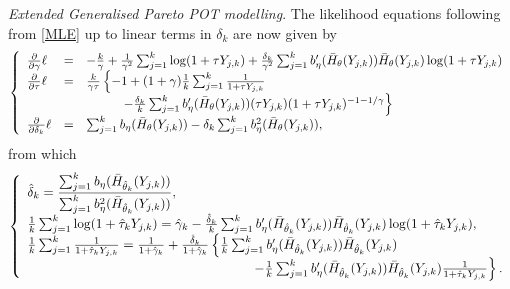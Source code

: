 \vspace{0.2cm}\noindent
{\it Extended Generalised Pareto POT modelling}. 
The likelihood equations following from \eqref{MLE} up to linear terms in $\delta_k$ are now given by
\[
\left\{
\begin{array}{lcl}
{\partial \over \partial \gamma} \ell &=&
-{k \over \gamma }+ {1 \over \gamma^2} \sum_{j=1}^k \log (1+\tau Y_{j,k})
 + {\delta_k \over \gamma^2} \sum_{j=1}^k b'_\eta (\bar{H}_{\theta}(Y_{j,k}))\bar{H}_{\theta}(Y_{j,k})\log (1+\tau Y_{j,k}) \\
 {\partial \over \partial \tau} \ell &=&
{k \over \gamma \tau}
\left\{ -1+ (1+\gamma) {1 \over k}\sum_{j=1}^k {1 \over 1+\tau Y_{j,k}} \right. \\
&& \hspace{1cm} \left. 
 -{\delta_k \over k}\sum_{j=1}^k b'_\eta (\bar{H}_{\theta}(Y_{j,k})) (\tau Y_{j,k}) (1+\tau Y_{j,k})^{-1-1/\gamma}
  \right\}
 \\
 {\partial \over \partial \delta_k} \ell &=&
 \sum_{j=1}^k b_\eta (\bar{H}_{\theta}(Y_{j,k}))-\delta_k \sum_{j=1}^k b^2_\eta (\bar{H}_{\theta}(Y_{j,k})),
\end{array}
\right.
\]
from which
\begin{equation}
 \left\{
\begin{array}{l}
\hat{\delta}_k = \dfrac{\sum_{j=1}^k b_\eta (\bar{H}_{\hat{\theta}_k}(Y_{j,k}))}{\sum_{j=1}^k b^2_\eta (\bar{H}_{\hat{\theta}_k}(Y_{j,k}))}, \\
{1 \over k}\sum_{j=1}^k \log (1+\hat{\tau}_k Y_{j,k})
= \hat{\gamma}_k- 
{\hat{\delta}_k \over k}\sum_{j=1}^k b'_{\eta}(\bar{H}_{\hat{\theta}_k}(Y_{j,k})) \bar{H}_{\hat{\theta}_k}(Y_{j,k}) \log (1+\hat{\tau}_k Y_{j,k}), \\
{1 \over k}\sum_{j=1}^k {1 \over 1+\hat{\tau}_k Y_{j,k}}
= {1 \over 1+ \hat{\gamma}_k} 
+ {\hat{\delta}_k \over 1+ \hat{\gamma}_k}
\left\{ 
{1\over k}\sum_{j=1}^k b'_{\eta}(\bar{H}_{\hat{\theta}_k}(Y_{j,k}))\bar{H}_{\hat{\theta}_k}(Y_{j,k}) \right.\\
 \hspace{6cm} \left.
- {1\over k}\sum_{j=1}^k b'_{\eta}(\bar{H}_{\hat{\theta}_k}(Y_{j,k}))\bar{H}_{\hat{\theta}_k}(Y_{j,k}) {1 \over 1+\hat{\tau}_k Y_{j,k}}
 \right\}.
\end{array}
\right.
\label{systemE}
\end{equation}

